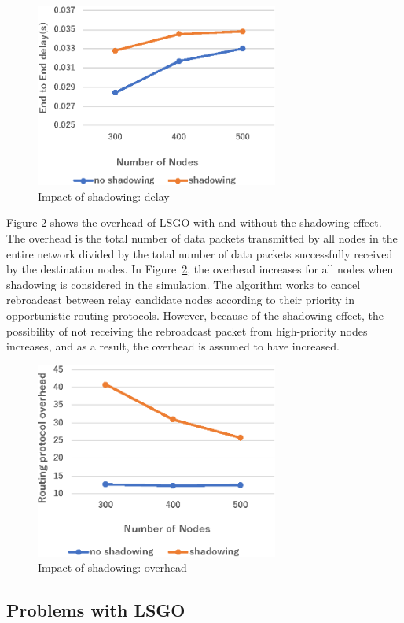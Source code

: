 \documentclass[conference]{IEEEtran}
\begin{document}
\begin{figure}[!ht]
\centering
\includegraphics[width=80mm]{figures/LSGO_delay.eps}
\caption{Impact of shadowing: delay}
\label{fig:LSGO-delay}
\end{figure}

Figure \ref{fig:LSGO-overhead} shows the overhead of LSGO with and without the shadowing effect. 
The overhead is the total number of data packets transmitted by all nodes in the entire network divided by the total number of data packets successfully received by the destination nodes.
In \mbox{Figure \ref{fig:LSGO-overhead}}, the overhead increases for all nodes when shadowing is considered in the simulation.
The algorithm works to cancel rebroadcast between relay candidate nodes according to their priority in opportunistic routing protocols.
However, because of the shadowing effect, the possibility of not receiving the rebroadcast packet from high-priority nodes increases, and as a result, the overhead is assumed to have increased. 
 

\begin{figure}[!ht]
\centering
\includegraphics[width=80mm]{figures/LSGO_overhead.eps}
\caption{Impact of shadowing: overhead}
\label{fig:LSGO-overhead}
\end{figure}

\subsection{Problems with LSGO}
\end{document}
